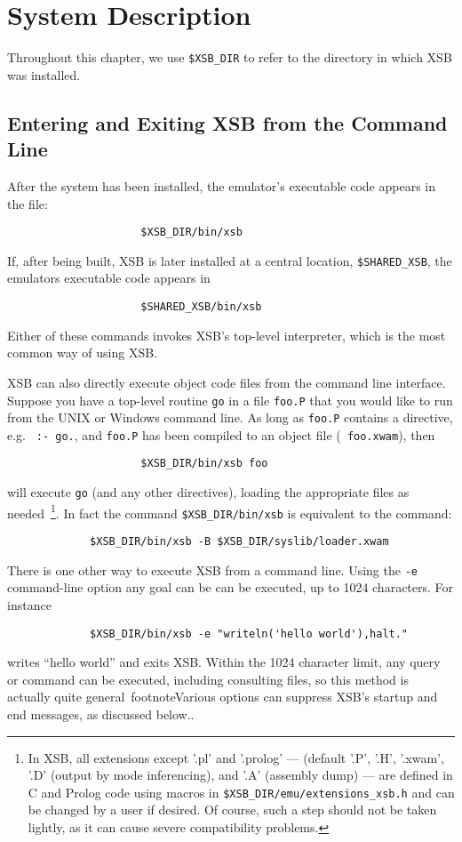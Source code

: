 \chapter{System Description} \label{chap:system}
\label{system}

Throughout this chapter, we use \verb'$XSB_DIR' to refer to the
directory in which XSB was installed.

\section{Entering and Exiting XSB from the Command Line}

After the system has been installed, the emulator's executable code appears 
in the file:
\begin{verbatim}
                     $XSB_DIR/bin/xsb
\end{verbatim}
If, after being built, XSB is later installed  at a central location,
\verb'$SHARED_XSB', the emulators executable code appears in
\begin{verbatim}
                     $SHARED_XSB/bin/xsb
\end{verbatim}
Either of these commands invokes XSB's top-level interpreter, which is
the most common way of using XSB.

XSB can also directly execute object code files from the command line
interface.  Suppose you have a top-level routine {\tt go} in a file
{\tt foo.P} that you would like to run from the UNIX or Windows
command line.  As long as {\tt foo.P} contains a directive, e.g. {\tt
  :- go.}, and {\tt foo.P} has been compiled to an object file ({\tt
  foo.xwam}), then
\begin{verbatim}
                     $XSB_DIR/bin/xsb foo
\end{verbatim}
will execute {\tt go} (and any other directives), loading the
appropriate files as needed~\footnote{In XSB, all extensions except
  '.pl' and '.prolog' --- (default '.P', '.H', '.xwam', '.D' (output by mode
  inferencing), and '.A' (assembly dump) --- are defined in C and
  Prolog code using macros in {\tt \$XSB\_DIR/emu/extensions\_xsb.h}
  and can be changed by a user if desired.  Of course, such a step
  should not be taken lightly, as it can cause severe compatibility
  problems.}.
%
In fact the command
\verb'$XSB_DIR/bin/xsb' is equivalent to the command:
\begin{verbatim}
             $XSB_DIR/bin/xsb -B $XSB_DIR/syslib/loader.xwam
\end{verbatim}
There is one other way to execute XSB from a command line.  Using the
{\tt -e} command-line option any goal can be can be executed, up to
1024 characters.  For instance 
\begin{verbatim}
             $XSB_DIR/bin/xsb -e "writeln('hello world'),halt."
\end{verbatim}
writes ``hello world'' and exits XSB.  Within the 1024 character
limit, any query or command can be executed, including consulting
files, so this method is actually quite general~footnote{Various
  options can suppress XSB's startup and end messages, as discussed
  below.}.


